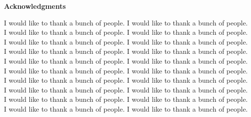 \MyDoubleSpacing
\begin{center}
  {\large\textbf{Acknowledgments}} 
\end{center}

\noindent \normalsize
I would like to thank a bunch of people. I would like to thank a bunch of people. I would like to thank a bunch of people. I would like to thank a bunch of people. I would like to thank a bunch of people. I would like to thank a bunch of people. I would like to thank a bunch of people. I would like to thank a bunch of people. I would like to thank a bunch of people. I would like to thank a bunch of people. I would like to thank a bunch of people. I would like to thank a bunch of people. I would like to thank a bunch of people. I would like to thank a bunch of people. I would like to thank a bunch of people. I would like to thank a bunch of people. I would like to thank a bunch of people. I would like to thank a bunch of people. I would like to thank a bunch of people. I would like to thank a bunch of people. 

\clearpage